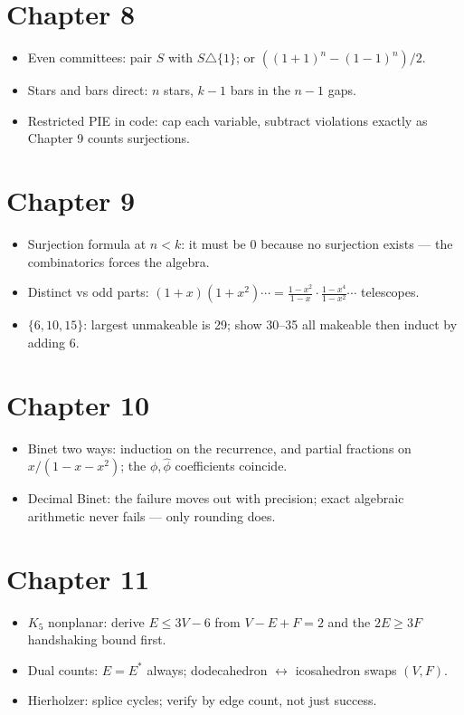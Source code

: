 \section*{Chapter 8}
\begin{itemize}
\item Even committees: pair $S$ with $S\triangle\{1\}$; or
$((1+1)^n-(1-1)^n)/2$.
\item Stars and bars direct: $n$ stars, $k-1$ bars in the $n-1$ gaps.
\item Restricted PIE in code: cap each variable, subtract violations
exactly as Chapter 9 counts surjections.
\end{itemize}

\section*{Chapter 9}
\begin{itemize}
\item Surjection formula at $n<k$: it must be 0 because no surjection
exists --- the combinatorics forces the algebra.
\item Distinct vs odd parts: $(1+x)(1+x^2)\cdots =
\frac{1-x^2}{1-x}\cdot\frac{1-x^4}{1-x^2}\cdots$ telescopes.
\item $\{6,10,15\}$: largest unmakeable is 29; show 30--35 all makeable
then induct by adding 6.
\end{itemize}

\section*{Chapter 10}
\begin{itemize}
\item Binet two ways: induction on the recurrence, and partial fractions
on $x/(1-x-x^2)$; the $\phi,\hat\phi$ coefficients coincide.
\item Decimal Binet: the failure moves out with precision; exact
algebraic arithmetic never fails --- only rounding does.
\end{itemize}

\section*{Chapter 11}
\begin{itemize}
\item $K_5$ nonplanar: derive $E\le3V-6$ from $V-E+F=2$ and the
$2E\ge3F$ handshaking bound first.
\item Dual counts: $E=E^*$ always; dodecahedron $\leftrightarrow$
icosahedron swaps $(V,F)$.
\item Hierholzer: splice cycles; verify by edge count, not just success.
\end{itemize}

